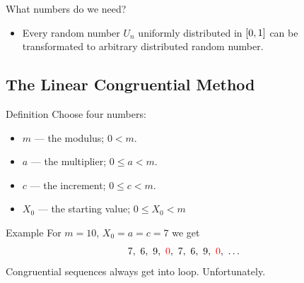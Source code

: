 \documentclass[12pt]{beamer}
\begin{document}
 \begin{frame}{What numbers do we need?}
  \begin{itemize}
   \item Every random number $U_n$ uniformly distributed in $\left[0, 1\right]$ can be transformated to arbitrary distributed random number.
  \end{itemize}
 \end{frame}

 \subsection{The Linear Congruential Method}
\begin{frame}{Definition}
Choose four numbers:
 \begin{itemize}
  \item $m$ --- the modulus; $0 < m$.
  \item $a$ --- the multiplier; $0 \leqslant a < m$.
  \item $c$ --- the increment; $0 \leqslant c < m$.
  \item $X_0$ --- the starting value; $0 \leqslant X_0 < m$
 \end{itemize} 
 
 \end{frame}
\begin{frame}{Example}
 For $m = 10$, $X_0 = a = c = 7$ we get
 $$7,\ 6,\ 9,\ \textcolor{red}{0},\ 7,\ 6,\ 9,\ \textcolor{red}{0},\ \ldots$$
Congruential sequences always get into loop. Unfortunately.
\end{frame}
\end{document}
